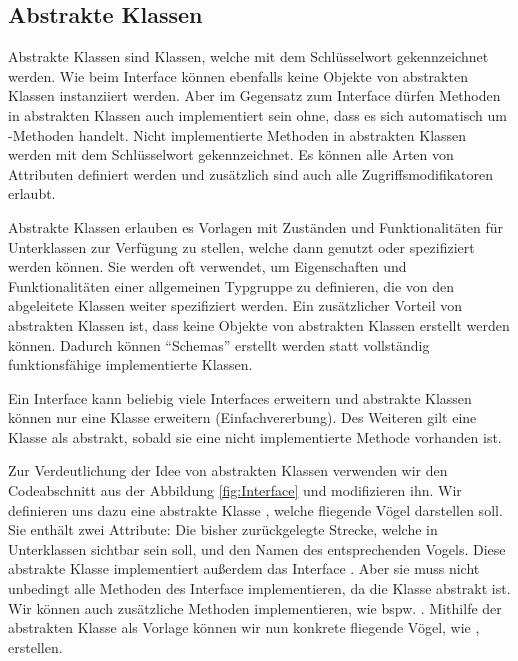 \documentclass{tuda-pub}
\begin{document}
  \clearpage

  \subsection{Abstrakte Klassen}
  Abstrakte Klassen sind Klassen, welche mit dem Schlüsselwort 
  gekennzeichnet werden. Wie beim Interface können ebenfalls keine Objekte von abstrakten Klassen
  instanziiert werden. Aber im Gegensatz zum Interface dürfen Methoden in abstrakten Klassen auch
  implementiert sein ohne, dass es sich automatisch um -Methoden handelt.
  Nicht implementierte Methoden in abstrakten Klassen werden mit dem Schlüsselwort
   gekennzeichnet. Es können alle Arten von Attributen definiert werden und
  zusätzlich sind auch alle Zugriffsmodifikatoren erlaubt.

  \br

  Abstrakte Klassen erlauben es Vorlagen mit Zuständen und Funktionalitäten für Unterklassen zur
  Verfügung zu stellen, welche dann genutzt oder spezifiziert werden können. Sie werden oft
  verwendet, um Eigenschaften und Funktionalitäten einer allgemeinen Typgruppe zu definieren, die
  von den abgeleitete Klassen weiter spezifiziert werden. Ein zusätzlicher Vorteil von abstrakten
  Klassen ist, dass keine Objekte von abstrakten Klassen erstellt werden können. Dadurch können
  \enquote{Schemas} erstellt werden statt vollständig funktionsfähige implementierte Klassen.


  \begin{note}[title=Information:]
    Ein Interface kann beliebig viele Interfaces erweitern und abstrakte Klassen können nur eine
    Klasse erweitern (Einfachvererbung). Des Weiteren gilt eine Klasse als abstrakt, sobald sie
    eine nicht implementierte Methode vorhanden ist.
  \end{note}

  Zur Verdeutlichung der Idee von abstrakten Klassen verwenden wir den Codeabschnitt aus der
  Abbildung \ref{fig:Interface} und modifizieren ihn. Wir definieren uns dazu eine abstrakte
  Klasse , welche fliegende Vögel darstellen soll. Sie enthält zwei
  Attribute: Die bisher zurückgelegte Strecke, welche in Unterklassen sichtbar sein soll, und den
  Namen des entsprechenden Vogels. Diese abstrakte Klasse implementiert außerdem das Interface
  . Aber sie muss nicht unbedingt alle Methoden des Interface implementieren,
  da die Klasse abstrakt ist. Wir können auch zusätzliche Methoden implementieren, wie bspw.
  . Mithilfe der abstrakten Klasse als Vorlage können wir nun konkrete
  fliegende Vögel, wie , erstellen.
\end{document}
